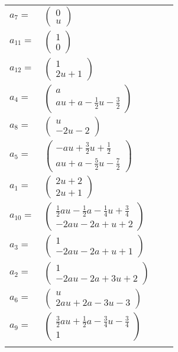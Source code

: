 \documentclass[1p]{elsarticle_modified}
\theoremstyle{definition}
\begin{document}
\begin{tabular}{m{7pt} m{180pt} m{7pt} m{180pt} }
\flushright $a_{7}=$&$\begin{pmatrix}0\\u\end{pmatrix}$ \\
\flushright $a_{11}=$&$\begin{pmatrix}1\\0\end{pmatrix}$ \\
\flushright $a_{12}=$&$\begin{pmatrix}1\\2 u+1\end{pmatrix}$ \\
\flushright $a_{4}=$&$\begin{pmatrix}a\\a u+a-\frac{1}{2} u-\frac{3}{2}\end{pmatrix}$ \\
\flushright $a_{8}=$&$\begin{pmatrix}u\\-2 u-2\end{pmatrix}$ \\
\flushright $a_{5}=$&$\begin{pmatrix}- a u+\frac{3}{2} u+\frac{1}{2}\\a u+a-\frac{5}{2} u-\frac{7}{2}\end{pmatrix}$ \\
\flushright $a_{1}=$&$\begin{pmatrix}2 u+2\\2 u+1\end{pmatrix}$ \\
\flushright $a_{10}=$&$\begin{pmatrix}\frac{1}{2} a u-\frac{1}{2} a-\frac{1}{4} u+\frac{3}{4}\\-2 a u-2 a+u+2\end{pmatrix}$ \\
\flushright $a_{3}=$&$\begin{pmatrix}1\\-2 a u-2 a+u+1\end{pmatrix}$ \\
\flushright $a_{2}=$&$\begin{pmatrix}1\\-2 a u-2 a+3 u+2\end{pmatrix}$ \\
\flushright $a_{6}=$&$\begin{pmatrix}u\\2 a u+2 a-3 u-3\end{pmatrix}$ \\
\flushright $a_{9}=$&$\begin{pmatrix}\frac{3}{2} a u+\frac{1}{2} a-\frac{3}{4} u-\frac{3}{4}\\1\end{pmatrix}$\\&\end{tabular}
\end{document}

